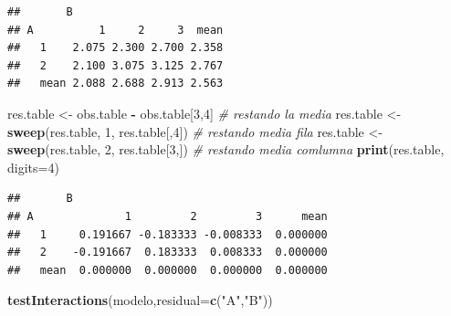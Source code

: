 \documentclass[]{book}
\newenvironment{Shaded}{\begin{snugshade}}{\end{snugshade}}
\newcommand{\KeywordTok}[1]{\textcolor[rgb]{0.13,0.29,0.53}{\textbf{#1}}}
\newcommand{\DataTypeTok}[1]{\textcolor[rgb]{0.13,0.29,0.53}{#1}}
\newcommand{\DecValTok}[1]{\textcolor[rgb]{0.00,0.00,0.81}{#1}}
\newcommand{\StringTok}[1]{\textcolor[rgb]{0.31,0.60,0.02}{#1}}
\newcommand{\CommentTok}[1]{\textcolor[rgb]{0.56,0.35,0.01}{\textit{#1}}}
\newcommand{\OtherTok}[1]{\textcolor[rgb]{0.56,0.35,0.01}{#1}}
\newcommand{\OperatorTok}[1]{\textcolor[rgb]{0.81,0.36,0.00}{\textbf{#1}}}
\newcommand{\NormalTok}[1]{#1}
\begin{document}
\begin{Shaded}
\end{Shaded}

\begin{verbatim}
##       B
## A          1     2     3  mean
##   1    2.075 2.300 2.700 2.358
##   2    2.100 3.075 3.125 2.767
##   mean 2.088 2.688 2.913 2.563
\end{verbatim}

\begin{Shaded}
\begin{Highlighting}[]
\NormalTok{res.table <-}\StringTok{ }\NormalTok{obs.table }\OperatorTok{-}\StringTok{ }\NormalTok{obs.table[}\DecValTok{3}\NormalTok{,}\DecValTok{4}\NormalTok{] }\CommentTok{# restando la media}
\NormalTok{res.table <-}\StringTok{ }\KeywordTok{sweep}\NormalTok{(res.table, }\DecValTok{1}\NormalTok{, res.table[,}\DecValTok{4}\NormalTok{]) }\CommentTok{# restando media fila}
\NormalTok{res.table <-}\StringTok{ }\KeywordTok{sweep}\NormalTok{(res.table, }\DecValTok{2}\NormalTok{, res.table[}\DecValTok{3}\NormalTok{,]) }\CommentTok{# restando media comlumna}
\KeywordTok{print}\NormalTok{(res.table, }\DataTypeTok{digits=}\DecValTok{4}\NormalTok{)}
\end{Highlighting}
\end{Shaded}

\begin{verbatim}
##       B
## A              1         2         3      mean
##   1     0.191667 -0.183333 -0.008333  0.000000
##   2    -0.191667  0.183333  0.008333  0.000000
##   mean  0.000000  0.000000  0.000000  0.000000
\end{verbatim}

\begin{Shaded}
\begin{Highlighting}[]
\KeywordTok{testInteractions}\NormalTok{(modelo,}\DataTypeTok{residual=}\KeywordTok{c}\NormalTok{(}\StringTok{"A"}\NormalTok{,}\StringTok{"B"}\NormalTok{))}
\end{Highlighting}
\end{Shaded}
\end{document}
